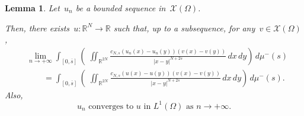 \documentclass[12pt,a4paper,intlimits,sumlimits]{amsart}
\def \R {\mathbb{R}}
\theoremstyle{definition}
\theoremstyle{plain}
\newtheorem{lemma}[definition]{Lemma}
\numberwithin{equation}{section}
\begin{document}
\begin{lemma}\label{Vitali}
Let~$u_n$ be a bounded sequence in~$\mathcal X(\Omega)$. 

Then, there exists~$u:\R^N\to\R$ such that, up to a subsequence, for any~$v\in\mathcal X(\Omega)$,
\begin{equation}\label{Vconv}
\begin{split}
&\lim_{n\to+\infty}\int_{[{{ 0 }}, \overline s]} \left(\;\iint_{\R^{2N}} \frac{c_{N,s}(u_n(x)-u_n(y)) (v(x)-v(y))}{|x-y|^{N+2s}} \, dx\, dy\right)\, d\mu^-(s)  \\
&\qquad =\int_{[{{ 0 }}, \overline s]} \left(\;\iint_{\R^{2N}} \frac{c_{N,s}(u(x)-u(y)) (v(x)-v(y))}{|x-y|^{N+2s}} \, dx\, dy\right)\, d\mu^-(s).
\end{split}
\end{equation}
Also, 
\begin{equation}\label{lunoconv}
{\mbox{$u_n$ converges to~$u$ in~$L^1(\Omega)$ as~$n\to+\infty$.}}
\end{equation}
\end{lemma}
\end{document}
